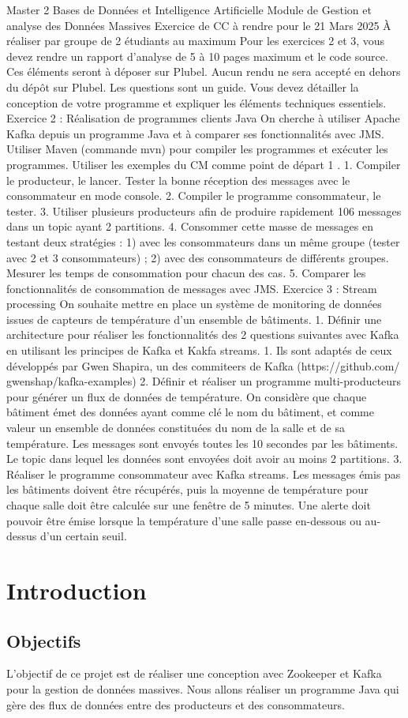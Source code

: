 Master 2 Bases de Données et Intelligence Artificielle
Module de Gestion et analyse des Données Massives
Exercice de CC à rendre pour le 21 Mars 2025
À réaliser par groupe de 2 étudiants au maximum
Pour les exercices 2 et 3, vous devez rendre un rapport d’analyse de 5 à 10 pages maximum et
le code source. Ces éléments seront à déposer sur Plubel. Aucun rendu ne sera accepté en dehors du
dépôt sur Plubel. Les questions sont un guide. Vous devez détailler la conception de votre programme
et expliquer les éléments techniques essentiels.
Exercice 2 : Réalisation de programmes clients Java
On cherche à utiliser Apache Kafka depuis un programme Java et à comparer ses fonctionnalités
avec JMS. Utiliser Maven (commande mvn) pour compiler les programmes et exécuter les programmes.
Utiliser les exemples du CM comme point de départ 1
.
1. Compiler le producteur, le lancer. Tester la bonne réception des messages avec le consommateur
en mode console.
2. Compiler le programme consommateur, le tester.
3. Utiliser plusieurs producteurs afin de produire rapidement 106 messages dans un topic ayant 2
partitions.
4. Consommer cette masse de messages en testant deux stratégies : 1) avec les consommateurs dans
un même groupe (tester avec 2 et 3 consommateurs) ; 2) avec des consommateurs de différents
groupes. Mesurer les temps de consommation pour chacun des cas.
5. Comparer les fonctionnalités de consommation de messages avec JMS.
Exercice 3 : Stream processing
On souhaite mettre en place un système de monitoring de données issues de capteurs de température
d’un ensemble de bâtiments.
1. Définir une architecture pour réaliser les fonctionnalités des 2 questions suivantes avec Kafka
en utilisant les principes de Kafka et Kakfa streams.
1. Ils sont adaptés de ceux développés par Gwen Shapira, un des commiteers de Kafka (https://github.com/
gwenshap/kafka-examples)
2. Définir et réaliser un programme multi-producteurs pour générer un flux de données de température. On considère que chaque bâtiment émet des données ayant comme clé le nom du
bâtiment, et comme valeur un ensemble de données constituées du nom de la salle et de sa
température. Les messages sont envoyés toutes les 10 secondes par les bâtiments. Le topic dans
lequel les données sont envoyées doit avoir au moins 2 partitions.
3. Réaliser le programme consommateur avec Kafka streams. Les messages émis pas les bâtiments
doivent être récupérés, puis la moyenne de température pour chaque salle doit être calculée sur
une fenêtre de 5 minutes. Une alerte doit pouvoir être émise lorsque la température d’une salle
passe en-dessous ou au-dessus d’un certain seuil.





\section{Introduction}

\subsection{Objectifs}

L'objectif de ce projet est de réaliser une conception avec Zookeeper et Kafka pour la gestion de données massives.
Nous allons réaliser un programme Java qui gère des flux de données entre des producteurs et des consommateurs.